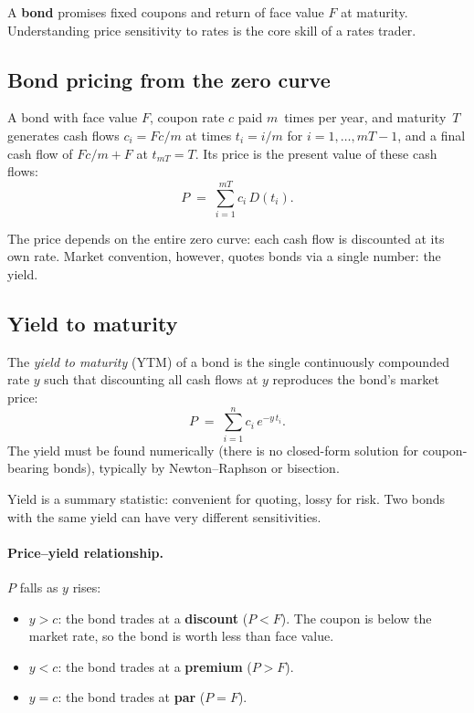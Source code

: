 A \textbf{bond} promises fixed coupons and return of face value $F$
at maturity.  Understanding price sensitivity to rates is the core
skill of a rates trader.

\subsection{Bond pricing from the zero curve}

\begin{definition}
A bond with face value $F$, coupon rate $c$ paid $m$~times per year,
and maturity~$T$ generates cash flows
$c_i = Fc/m$ at times $t_i = i/m$ for $i = 1, \ldots, mT - 1$,
and a final cash flow of $Fc/m + F$ at $t_{mT} = T$.
Its price is the present value of these cash flows:
\begin{equation}
  P \;=\; \sum_{i=1}^{mT} c_i \, D(t_i).
  \label{eq:bond_price}
\end{equation}
\end{definition}

The price depends on the entire zero curve: each cash flow is
discounted at its own rate.  Market convention, however, quotes bonds
via a single number: the yield.

\subsection{Yield to maturity}

\begin{definition}
The \emph{yield to maturity} (YTM) of a bond is the single
continuously compounded rate $y$ such that discounting all cash flows
at $y$ reproduces the bond's market price:
\begin{equation}
  P \;=\; \sum_{i=1}^{n} c_i \, e^{-y\,t_i}.
  \label{eq:ytm}
\end{equation}
The yield must be found numerically (there is no closed-form solution
for coupon-bearing bonds), typically by Newton--Raphson or bisection.
\end{definition}

Yield is a summary statistic: convenient for quoting, lossy for risk.
Two bonds with the same yield can have very different sensitivities.

\paragraph{Price--yield relationship.}
$P$ falls as $y$ rises:
\begin{itemize}
  \item $y > c$: the bond trades at a \textbf{discount} ($P < F$).
    The coupon is below the market rate, so the bond is worth less
    than face value.
  \item $y < c$: the bond trades at a \textbf{premium} ($P > F$).
  \item $y = c$: the bond trades at \textbf{par} ($P = F$).
\end{itemize}

